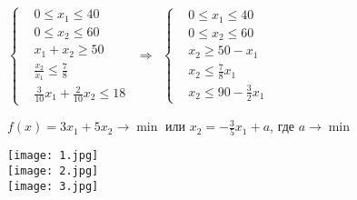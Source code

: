 \documentclass{article}
\begin{document}
$\left\{\begin{aligned}
    &0 \leq x_1 \leq 40 \\
    &0 \leq x_2 \leq 60 \\
    &x_1 + x_2 \geq 50 \\
    &\frac{x_2}{x_1} \leq \frac{7}{8} \\
    &\frac{3}{10}x_1 + \frac{2}{10}x_2 \leq 18
\end{aligned}\right. \ \ \Longrightarrow \ \
\left\{\begin{aligned}
    &0 \leq x_1 \leq 40 \\
    &0 \leq x_2 \leq 60 \\
    &x_2 \geq 50 - x_1 \\
    &x_2 \leq \frac{7}{8}x_1 \\
    &x_2 \leq90 -\frac{3}{2}x_1
\end{aligned}\right.$

\vspace{10pt}

$f(x) = 3x_1 + 5x_2 \rightarrow \min$ или $x_2 = -\frac{3}{5}x_1 + a$, где $a \rightarrow \min$

\texttt{[image: 1.jpg]}\\

\texttt{[image: 2.jpg]}\\

\texttt{[image: 3.jpg]}\\
\end{document}
